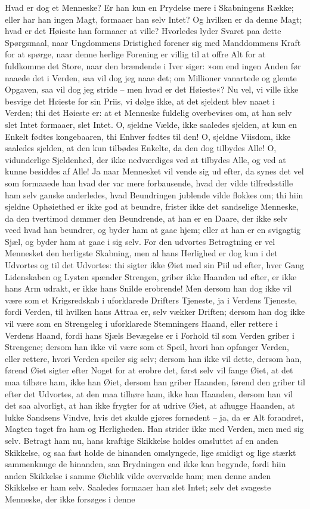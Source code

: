 \documentclass[12pt,a4paper]{article}
\begin{document}
Hvad er dog et Menneske? Er han kun en Prydelse mere i Skabningens Række; eller har han ingen Magt, formaaer han selv Intet? Og hvilken er da denne Magt; hvad er det Høieste han formaaer at ville? Hvorledes lyder Svaret paa dette Spørgsmaal, naar Ungdommens Dristighed forener sig med Manddommens Kraft for at spørge, naar denne herlige Forening er villig til at offre Alt for at fuldkomme det Store, naar den brændende i Iver siger: »om end ingen Anden før naaede det i Verden, saa vil dog jeg naae det; om Millioner vanartede og glemte Opgaven, saa vil dog jeg stride – men hvad er det Høieste«? Nu vel, vi ville ikke besvige det Høieste for sin Priis, vi dølge ikke, at det sjeldent blev naaet i Verden; thi det Høieste er: at et Menneske fuldelig overbevises om, at han selv slet Intet formaaer, slet Intet. O, sjeldne Vælde, ikke saaledes sjelden, at kun en Enkelt fødtes kongebaaren, thi Enhver fødtes til den! O, sjeldne Viisdom, ikke saaledes sjelden, at den kun tilbødes Enkelte, da den dog tilbydes Alle! O, vidunderlige Sjeldenhed, der ikke nedværdiges ved at tilbydes Alle, og ved at kunne besiddes af Alle! Ja naar Mennesket vil vende sig ud efter, da synes det vel som formaaede han hvad der var mere forbausende, hvad der vilde tilfredsstille ham selv ganske anderledes, hvad Beundringen jublende vilde flokkes om; thi hiin sjeldne Ophøiethed er ikke god at beundre, frister ikke det sandselige Menneske, da den tvertimod dømmer den Beundrende, at han er en Daare, der ikke selv veed hvad han beundrer, og byder ham at gaae hjem; eller at han er en svigagtig Sjæl, og byder ham at gaae i sig selv. For den udvortes Betragtning er vel Mennesket den herligste Skabning, men al hans Herlighed er dog kun i det Udvortes og til det Udvortes: thi sigter ikke Øiet med sin Piil ud efter, hver Gang Lidenskaben og Lysten spænder Strengen, griber ikke Haanden ud efter, er ikke hans Arm udrakt, er ikke hans Snilde erobrende! Men dersom han dog ikke vil være som et Krigsredskab i uforklarede Drifters Tjeneste, ja i Verdens Tjeneste, fordi Verden, til hvilken hans Attraa er, selv vækker Driften; dersom han dog ikke vil være som en Strengeleg i uforklarede Stemningers Haand, eller rettere i Verdens Haand, fordi hans Sjæls Bevægelse er i Forhold til som Verden griber i Strengene; dersom han ikke vil være som et Speil, hvori han opfanger Verden, eller rettere, hvori Verden speiler sig selv; dersom han ikke vil dette, dersom han, førend Øiet sigter efter Noget for at erobre det, først selv vil fange Øiet, at det maa tilhøre ham, ikke han Øiet, dersom han griber Haanden, førend den griber til efter det Udvortes, at den maa tilhøre ham, ikke han Haanden, dersom han vil det saa alvorligt, at han ikke frygter for at udrive Øiet, at afhugge Haanden, at lukke Sandsens Vindve, hvis det skulde gjøres fornødent – ja, da er Alt forandret, Magten taget fra ham og Herligheden. Han strider ikke med Verden, men med sig selv. Betragt ham nu, hans kraftige Skikkelse holdes omsluttet af en anden Skikkelse, og saa fast holde de hinanden omslyngede, lige smidigt og lige stærkt sammenknuge de hinanden, saa Brydningen end ikke kan begynde, fordi hiin anden Skikkelse i samme Øieblik vilde overvælde ham; men denne anden Skikkelse er ham selv. Saaledes formaaer han slet Intet; selv det svageste Menneske, der ikke forsøges i denne 
\end{document}
